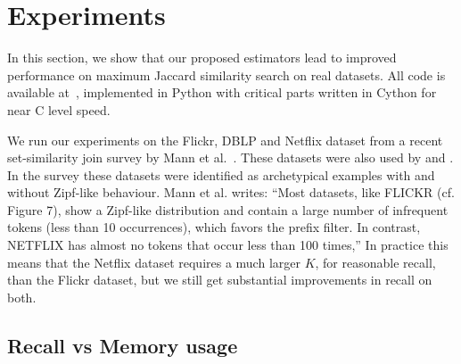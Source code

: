 
\section{Experiments}\label{sec:evaluation}

In this section, we show that our proposed estimators lead to improved performance on maximum
Jaccard similarity search on real datasets.
All code is available at~\cite{codes}, implemented in Python with critical parts written in Cython for near C level speed.

We run our experiments on the Flickr, DBLP and Netflix dataset from a recent set-similarity join survey by Mann et al.~\cite{mann2016empirical}.
These datasets were also used by \cite{christiani2018scalable} and \cite{ahle2020problem}.
In the survey these datasets were identified as archetypical examples with and without Zipf-like behaviour.
Mann et al. writes:
 ``Most datasets, like FLICKR (cf. Figure 7), show a Zipf-like
 distribution and contain a large number of infrequent tokens (less
 than 10 occurrences), which favors the prefix filter. In contrast,
 NETFLIX has almost no tokens that occur less than 100 times,''
In practice this means that the Netflix dataset requires a much larger $K$, for reasonable recall, than the Flickr dataset, but we still get substantial improvements in recall on both.

\subsection{Recall vs Memory usage}





% 
% 

